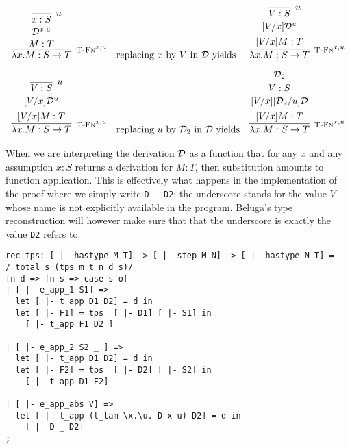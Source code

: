 \[
\begin{array}{c@{\quad}l@{\quad}c}
\infer[\TFn^{x,u}]
      {\lam x. M : S \arrow T}
      {\deduce[\vspace{2pt}]{M:T}
              {\deduce[\vspace{2pt}]{\D^{x,u}}
                      {\infer[u]{x:S}{}}}} &
\mbox{replacing $x$ by $V$ in $\D$ yields} &
\infer[\TFn^{x,u}]
      {\lam x. M : S \arrow T}
      {\deduce[\vspace{2pt}]{[V/x] M:T}
              {\deduce[\vspace{2pt}]{[V/x]\D^{u}}
                      {\infer[u]{V:S}{}}}}\\[1em]
\infer[\TFn^{x,u}]
      {\lam x. M : S \arrow T}
      {\deduce[\vspace{2pt}]{[V/x] M:T}
              {\deduce[\vspace{2pt}]{[V/x]\D^{u}}
                      {\infer[u]{V:S}{}}}} &
\mbox{replacing $u$ by $\D_2$ in $\D$ yields} &
\infer[\TFn^{x,u}]
      {\lam x. M : S \arrow T}
      {\deduce[\vspace{2pt}]{[V/x] M:T}
              {\deduce[\vspace{2pt}]{[V/x][\D_2/u]\D}
                      {\deduce[\vspace{2pt}]{V:S}{\D_2}}}}
\end{array}
\]

When we are interpreting the derivation ${\mathcal{D}}$ as a function that
for any $x$ and any assumption $x:S$ returns a derivation for $M:T$,
then substitution amounts to function application. This is effectively
what happens in the implementation of the proof where we simply write
\lstinline!D _ D2!; the underscore stands for the value $V$ whose name
is not explicitly available in the program. Beluga's type
reconstruction will however make sure that that the underscore is
exactly the value \lstinline!D2! refers to.


\begin{lstlisting}
rec tps: [ |- hastype M T] -> [ |- step M N] -> [ |- hastype N T] =
/ total s (tps m t n d s)/
fn d => fn s => case s of
| [ |- e_app_1 S1] =>
  let [ |- t_app D1 D2] = d in
  let [ |- F1] = tps  [ |- D1] [ |- S1] in
    [ |- t_app F1 D2 ]

| [ |- e_app_2 S2 _ ] =>
  let [ |- t_app D1 D2] = d in
  let [ |- F2] = tps  [ |- D2] [ |- S2] in
    [ |- t_app D1 F2]

| [ |- e_app_abs V] =>
  let [ |- t_app (t_lam \x.\u. D x u) D2] = d in
    [ |- D _ D2]
;
\end{lstlisting}


